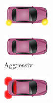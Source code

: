 \begin{figure} %
\begin{subfigure}{0.1\linewidth}
		\centering
		\includegraphics[width=\linewidth]{images/indicating_a}
		\label{fig:indicatinga}
\end{subfigure}
\begin{subfigure}{0.11\linewidth}
	\centering
	\includegraphics[width=\linewidth]{images/normal_a}
	\caption*{Aggressiv}
	\label{fig:normala}
\end{subfigure} 
\begin{subfigure}{0.1\linewidth}
		 \centering
		 \includegraphics[width=\linewidth]{images/breaking_a}

\end{subfigure}
\end{figure}
